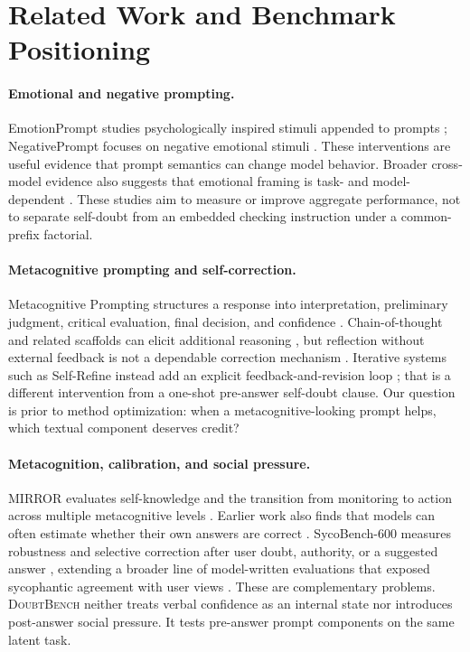 \documentclass[sigconf]{acmart}
\newcommand{\bench}{\textsc{DoubtBench}}
\begin{document}
\section{Related Work and Benchmark Positioning}

\paragraph{Emotional and negative prompting.}
EmotionPrompt studies psychologically inspired stimuli appended to prompts
\cite{li2023emotionprompt}; NegativePrompt focuses on negative emotional
stimuli \cite{wang2024negativeprompt}. These interventions are useful evidence
that prompt semantics can change model behavior. Broader cross-model evidence
also suggests that emotional framing is task- and model-dependent
\cite{zhao2026emotions}. These studies aim to measure or improve aggregate
performance, not to separate self-doubt from an embedded checking instruction
under a common-prefix factorial.

\paragraph{Metacognitive prompting and self-correction.}
Metacognitive Prompting structures a response into interpretation, preliminary
judgment, critical evaluation, final decision, and confidence
\cite{wang2024metacognitive}. Chain-of-thought and related scaffolds can elicit
additional reasoning \cite{wei2022chain}, but reflection without external
feedback is not a dependable correction mechanism
\cite{huang2023cannot}. Iterative systems such as Self-Refine instead add an
explicit feedback-and-revision loop \cite{madaan2023selfrefine}; that is a
different intervention from a one-shot pre-answer self-doubt clause. Our
question is prior to method optimization: when a metacognitive-looking prompt
helps, which textual component deserves credit?

\paragraph{Metacognition, calibration, and social pressure.}
MIRROR evaluates self-knowledge and the transition from monitoring to action
across multiple metacognitive levels \cite{wang2026mirror}. Earlier work also
finds that models can often estimate whether their own answers are correct
\cite{kadavath2022mostly}. SycoBench-600
measures robustness and selective correction after user doubt, authority, or a
suggested answer \cite{sinha2026sycobench}, extending a broader line of
model-written evaluations that exposed sycophantic agreement with user views
\cite{perez2022modelwritten}. These are complementary problems.
\bench{} neither treats verbal confidence as an internal state nor introduces
post-answer social pressure. It tests pre-answer prompt components on the same
latent task.
\end{document}
